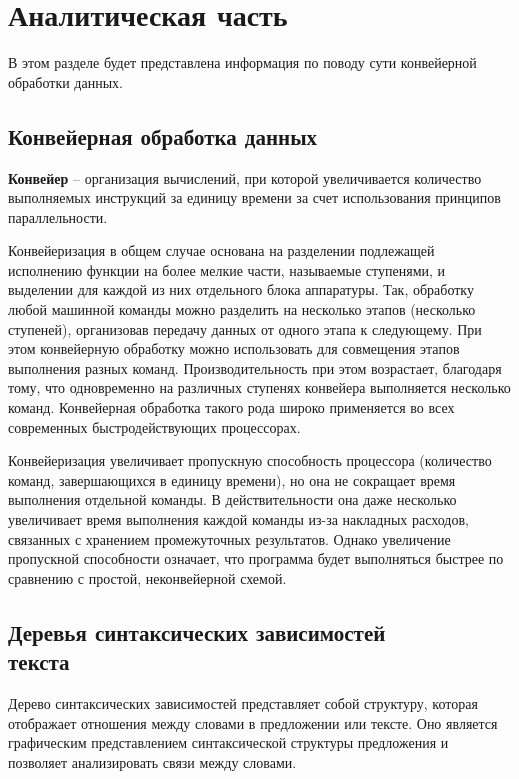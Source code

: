 \chapter{Аналитическая часть}
В этом разделе будет представлена информация по поводу сути конвейерной обработки данных.


\section{Конвейерная обработка данных}

\textbf{Конвейер} \cite{conveyer} -- организация вычислений, при которой увеличивается количество выполняемых инструкций за единицу времени за счет использования принципов параллельности.

Конвейеризация в общем случае основана на разделении подлежащей исполнению функции на более мелкие части, называемые ступенями, и выделении для каждой из них отдельного блока аппаратуры. 
Так, обработку любой машинной команды можно разделить на несколько этапов (несколько ступеней), организовав передачу данных от одного этапа к следующему. 
При этом конвейерную обработку можно использовать для совмещения этапов выполнения разных команд.
Производительность при этом возрастает, благодаря тому, что одновременно на различных ступенях конвейера выполняется несколько команд. 
Конвейерная обработка такого рода широко применяется во всех современных быстродействующих процессорах.

Конвейеризация увеличивает пропускную способность процессора (количество команд, завершающихся в единицу времени), но она не сокращает время выполнения отдельной команды. 
В действительности она даже несколько увеличивает время выполнения каждой команды из-за накладных расходов, связанных с хранением промежуточных результатов. 
Однако увеличение пропускной способности означает, что программа будет выполняться быстрее по сравнению с простой, неконвейерной схемой.

\section[Деревья синтаксических зависимостей текста]{Деревья синтаксических зависимостей\\ текста}

Дерево синтаксических зависимостей представляет собой структуру, которая отображает отношения между словами в предложении или тексте. 
Оно является графическим представлением синтаксической структуры предложения и позволяет анализировать связи между словами.

